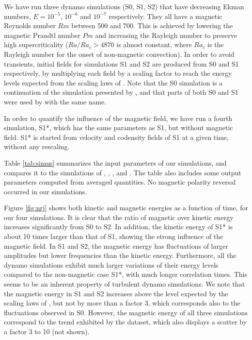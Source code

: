 \documentclass[12pt, a4paper]{article}
\begin{document}


We have run three dynamo simulations (S0, S1, S2) that have decreasing Ekman numbers, $E=10^{-5}$, $10^{-6}$ and $10^{-7}$ respectively.
They all have a magnetic Reynolds number $Rm$ between 500 and 700.
This is achieved by lowering the magnetic Prandtl number $Pm$ and increasing the Rayleigh number to preserve high supercriticality ($Ra/Ra_c > 4870$ is almost constant, where $Ra_c$ is the Rayleigh number for the onset of non-magnetic convection).
In order to avoid transients, initial fields for simulations S1 and S2 are produced from S0 and S1 respectively, by multiplying each field by a scaling factor to reach the energy levels expected from the scaling laws of \citet{christensen2006}.
Note that the S0 simulation is a continuation of the simulation presented by \citet{fournier2012egu}, and that parts of both S0 and S1 were used by \citet{bouligand2016} with the same name.

In order to quantify the influence of the magnetic field, we have run a fourth simulation, S1*, which has the same parameters as S1, but without magnetic field.
S1* is started from velocity and codensity fields of S1 at a given time, without any rescaling.

Table \ref{tab:simus} summarizes the input parameters of our simulations, and compares it to the simulations of \citet{kageyama2008}, \citet{sakuraba2009}, \cite{sheyko2014phd}, \citet{yadav2016b} and \citet{aubert2017}.
The table also includes some output parameters computed from averaged quantities.
No magnetic polarity reversal occurred in our simulations.


Figure \ref{fig:nrj} shows both kinetic and magnetic energies as a function of time, for our four simulations.
It is clear that the ratio of magnetic over kinetic energy increases significantly from S0 to S2.
In addition, the kinetic energy of S1* is about 10 times larger than that of S1, showing the strong influence of the magnetic field.
In S1 and S2, the magnetic energy has fluctuations of larger amplitudes but lower frequencies than the kinetic energy.
Furthermore, all the dynamo simulations exhibit much larger variations of their energy levels compared to the non-magnetic case S1*, with much longer correlation times.
This seems to be an inherent property of turbulent dynamo simulations.
We note that the magnetic energy in S1 and S2 increases above the level expected by the scaling laws of \citet{christensen2006}, but not by more than a factor 3, which corresponds also to the fluctuations observed in S0.
However, the magnetic energy of all three simulations correspond to the trend exhibited by the \citet{christensen2006} dataset, which also displays a scatter by a factor 3 to 10 (not shown).
\end{document}
